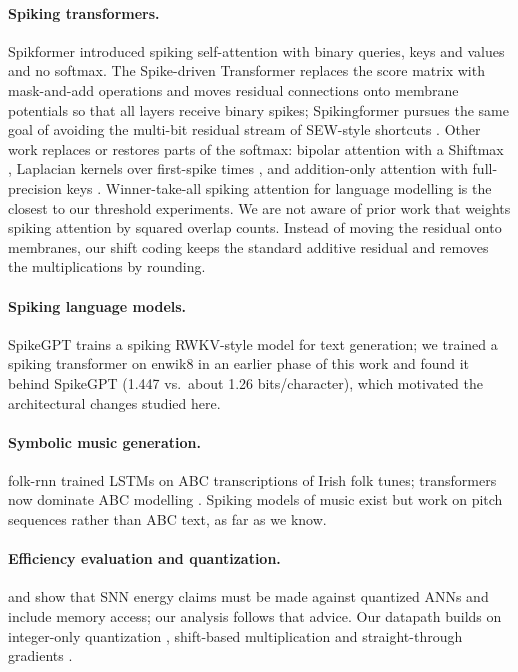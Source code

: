 \documentclass[10pt]{article}
\begin{document}
\paragraph{Spiking transformers.} Spikformer \citep{zhou2023spikformer} introduced spiking self-attention with
binary queries, keys and values and no softmax. The Spike-driven Transformer \citep{yao2023spikedriven} replaces
the score matrix with mask-and-add operations and moves residual connections onto membrane potentials so that all
layers receive binary spikes; Spikingformer \citep{zhou2023spikingformer} pursues the same goal of avoiding the
multi-bit residual stream of SEW-style shortcuts \citep{fang2021sew}. Other work replaces or restores parts of the
softmax: bipolar attention with a Shiftmax \citep{bipolar2025}, Laplacian kernels over first-spike times
\citep{lapis2026}, and addition-only attention with full-precision keys \citep{a2os2a2025}. Winner-take-all
spiking attention for language modelling \citep{wta2026} is the closest to our threshold experiments. We are not
aware of prior work that weights spiking attention by squared overlap counts. Instead of moving the residual onto
membranes, our shift coding keeps the standard additive residual and removes the multiplications by rounding.

\paragraph{Spiking language models.} SpikeGPT \citep{zhu2023spikegpt} trains a spiking RWKV-style model for text
generation; we trained a spiking transformer on enwik8 in an earlier phase of this work and found it behind
SpikeGPT (1.447 vs.\ about 1.26 bits/character), which motivated the architectural changes studied here.

\paragraph{Symbolic music generation.} folk-rnn \citep{sturm2016folkrnn} trained LSTMs on ABC transcriptions of
Irish folk tunes; transformers now dominate ABC modelling \citep{qu2024mupt, wang2025notagen}. Spiking models of
music exist but work on pitch sequences rather than ABC text, as far as we know.

\paragraph{Efficiency evaluation and quantization.} \citet{yan2024reconsidering} and \citet{shen2024efficient}
show that SNN energy claims must be made against quantized ANNs and include memory access; our analysis follows
that advice. Our datapath builds on integer-only quantization \citep{jacob2018quantization}, shift-based
multiplication \citep{elhoushi2021deepshift} and straight-through gradients \citep{bengio2013estimating}.
\end{document}
